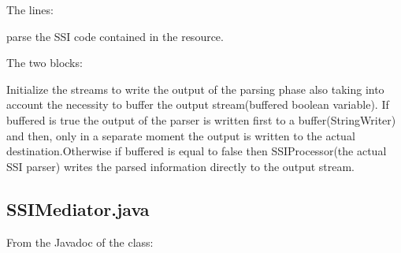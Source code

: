 \documentclass[11pt,titlepage]{article} %
\begin{document}
\begin{itemize}
      The lines:
      
      
      parse the SSI code contained in the resource.
      
      The two blocks:
      
      
      Initialize the streams to write the output of the parsing phase also taking into account the necessity
      to buffer the output stream(buffered boolean variable).\newline
      If buffered is true the output of the parser is written first to a buffer(StringWriter) and then, only in a separate moment
      the output is written to the actual destination.Otherwise if buffered is equal to false then SSIProcessor(the actual SSI parser)
      writes the parsed information directly to the output stream.

  \end{itemize}

\subsection{SSIMediator.java}
  From the Javadoc of the class:
  
  
  
\end{document}
